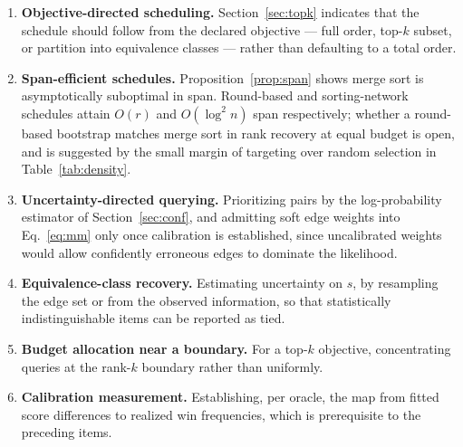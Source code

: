 \documentclass[11pt,a4paper]{article}
\begin{document}
\begin{enumerate}
  \item \textbf{Objective-directed scheduling.} Section~\ref{sec:topk} indicates
    that the schedule should follow from the declared objective --- full order,
    top-$k$ subset, or partition into equivalence classes --- rather than
    defaulting to a total order.
  \item \textbf{Span-efficient schedules.} Proposition~\ref{prop:span} shows
    merge sort is asymptotically suboptimal in span. Round-based and
    sorting-network schedules attain $O(r)$ and $O(\log^2 n)$ span respectively;
    whether a round-based bootstrap matches merge sort in rank recovery at equal
    budget is open, and is suggested by the small margin of targeting over random
    selection in Table~\ref{tab:density}.
  \item \textbf{Uncertainty-directed querying.} Prioritizing pairs by the
    log-probability estimator of Section~\ref{sec:conf}, and admitting soft edge
    weights into Eq.~\eqref{eq:mm} only once calibration is established, since
    uncalibrated weights would allow confidently erroneous edges to dominate the
    likelihood.
  \item \textbf{Equivalence-class recovery.} Estimating uncertainty on $s$, by
    resampling the edge set or from the observed information, so that
    statistically indistinguishable items can be reported as tied.
  \item \textbf{Budget allocation near a boundary.} For a top-$k$ objective,
    concentrating queries at the rank-$k$ boundary rather than uniformly.
  \item \textbf{Calibration measurement.} Establishing, per oracle, the map from
    fitted score differences to realized win frequencies, which is prerequisite
    to the preceding items.
\end{enumerate}
\end{document}
